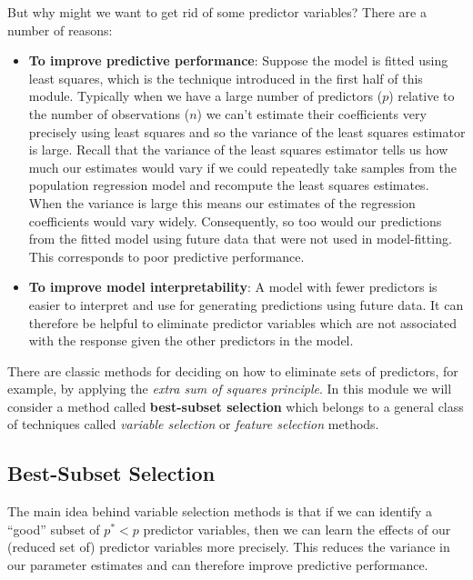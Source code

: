 \documentclass[
]{article}
\providecommand{\tightlist}{%
  \setlength{\itemsep}{0pt}\setlength{\parskip}{0pt}}
\begin{document}
But why might we want to get rid of some predictor variables? There are
a number of reasons:

\begin{itemize}
\tightlist
\item
  \textbf{To improve predictive performance}: Suppose the model is
  fitted using least squares, which is the technique introduced in the
  first half of this module. Typically when we have a large number of
  predictors (\(p\)) relative to the number of observations (\(n\)) we
  can't estimate their coefficients very precisely using least squares
  and so the variance of the least squares estimator is large. Recall
  that the variance of the least squares estimator tells us how much our
  estimates would vary if we could repeatedly take samples from the
  population regression model and recompute the least squares estimates.
  When the variance is large this means our estimates of the regression
  coefficients would vary widely. Consequently, so too would our
  predictions from the fitted model using future data that were not used
  in model-fitting. This corresponds to poor predictive performance.
\item
  \textbf{To improve model interpretability}: A model with fewer
  predictors is easier to interpret and use for generating predictions
  using future data. It can therefore be helpful to eliminate predictor
  variables which are not associated with the response given the other
  predictors in the model.
\end{itemize}

There are classic methods for deciding on how to eliminate sets of
predictors, for example, by applying the \emph{extra sum of squares
principle}. In this module we will consider a method called
\textbf{best-subset selection} which belongs to a general class of
techniques called \emph{variable selection} or \emph{feature selection}
methods.

\hypertarget{subsec:bss}{%
\subsection{Best-Subset Selection}\label{subsec:bss}}

The main idea behind variable selection methods is that if we can
identify a ``good'' subset of \(p^{\ast}<p\) predictor variables, then
we can learn the effects of our (reduced set of) predictor variables
more precisely. This reduces the variance in our parameter estimates and
can therefore improve predictive performance.
\end{document}
